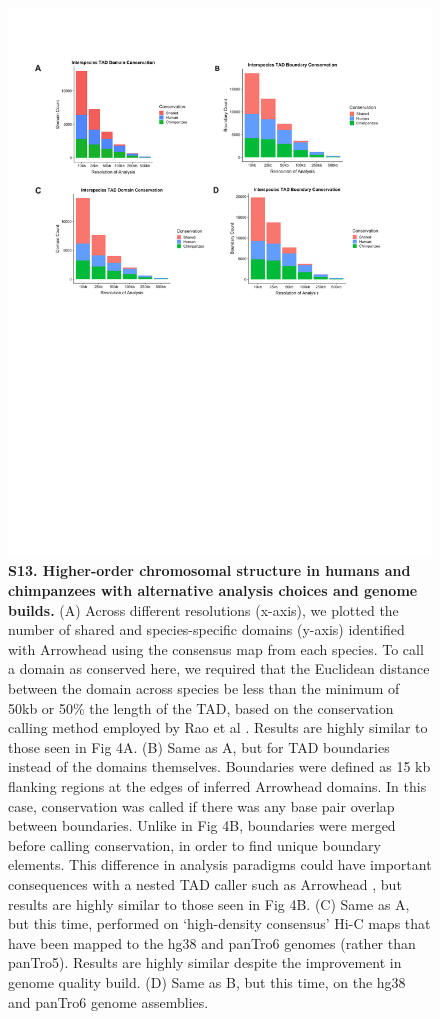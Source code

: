 \begin{figure}[!htb]
\centering
\includegraphics[width=6in]{img/figS13.pdf}
\caption[Higher-order chromosomal structure in humans and chimpanzees with alternative analysis choices and genome builds.]{\textbf{S13. Higher-order chromosomal structure in humans and chimpanzees with alternative analysis choices and genome builds.} (A) Across different resolutions (x-axis), we plotted the number of shared and species-specific domains (y-axis) identified with Arrowhead \cite{Durand.2016} using the consensus map from each species. To call a domain as conserved here, we required that the Euclidean distance between the domain across species be less than the minimum of 50kb or 50\% the length of the TAD, based on the conservation calling method employed by Rao et al \cite{Rao.2014}. Results are highly similar to those seen in Fig 4A. (B) Same as A, but for TAD boundaries instead of the domains themselves. Boundaries were defined as 15 kb flanking regions at the edges of inferred Arrowhead domains. In this case, conservation was called if there was any base pair overlap between boundaries. Unlike in Fig 4B, boundaries were merged before calling conservation, in order to find unique boundary elements. This difference in analysis paradigms could have important consequences with a nested TAD caller such as Arrowhead \cite{Durand.2016}, but results are highly similar to those seen in Fig 4B. (C) Same as A, but this time, performed on `high-density consensus' Hi-C maps that have been mapped to the hg38 and panTro6 genomes (rather than panTro5). Results are highly similar despite the improvement in genome quality build. (D) Same as B, but this time, on the hg38 and panTro6 genome assemblies.}

\end{figure}
